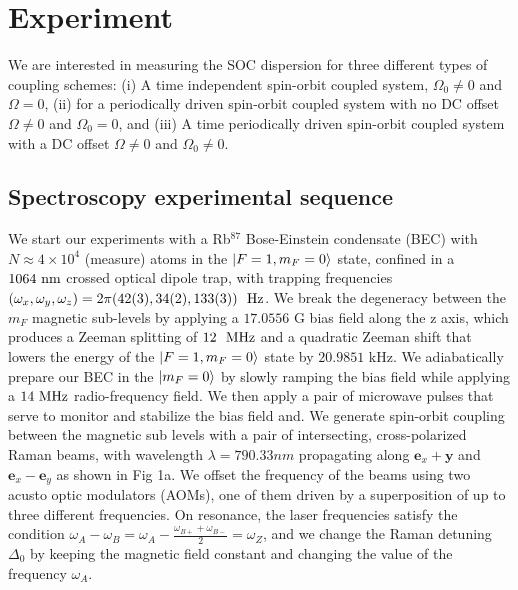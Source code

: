 \section{Experiment}

We are interested in measuring the SOC dispersion for three different types of coupling schemes: (i) A time independent spin-orbit coupled system, $\Omega_0\neq0$ and $\Omega=0$, (ii) for a periodically driven spin-orbit coupled system with no DC offset $\Omega\neq0$ and $\Omega_0=0$, and (iii) A time periodically driven spin-orbit coupled system with a DC offset $\Omega\neq0$ and $\Omega_0\neq0$. 

\subsection{Spectroscopy experimental sequence}


We start our experiments with a Rb$^{87}$ Bose-Einstein condensate (BEC) with $N\approx 4\times 10^4$ (measure) atoms in the $|F=1,m_F=0\rangle$ state, confined in a $1064{\ {\rm nm}}$ crossed optical dipole trap, with trapping frequencies $(\omega_x,\omega_y,\omega_z)=2\pi(42(3),34(2),133(3))\ \Hz$. We break the degeneracy between the $m_F$ magnetic sub-levels by applying a $17.0556$ G bias field along the z axis, which produces a Zeeman splitting of $12 \ {\ {\rm MHz}}$ and a quadratic Zeeman shift that lowers the energy of the $|F=1,m_F=0\rangle$ state  by $20.9851$ kHz. We adiabatically prepare our BEC in the $|m_F=0\rangle$ by slowly ramping the bias field while applying a $14{\ {\rm MHz}}$ radio-frequency field. We then apply a pair of microwave pulses that serve to monitor and stabilize the bias field and. We generate spin-orbit coupling between the magnetic sub levels with a pair of intersecting, cross-polarized Raman beams, with wavelength $\lambda=790.33 nm$ propagating along $\mathbf{e}_x+\mathbf{y}$ and $\mathbf{e}_x-\mathbf{e}_y$ as shown in Fig 1a. We offset the frequency of the beams using two acusto optic modulators (AOMs), one of them driven by a superposition of up to three different frequencies. On resonance, the laser frequencies satisfy the condition $\omega_A-\omega_B=\omega_A-\frac{\omega_{B+}+\omega_{B-}}{2}=\omega_Z$, and we change the Raman detuning $\Delta_0$ by keeping the magnetic field constant and changing the value of the frequency $\omega_A$.

